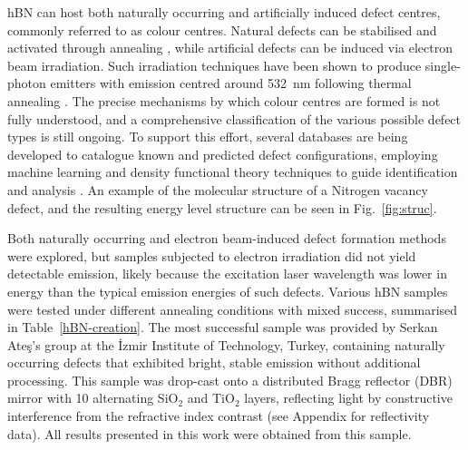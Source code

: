 hBN can host both naturally occurring and artificially induced defect centres, commonly referred to as colour centres. Natural defects can be stabilised and activated through annealing \cite{Mohajerani2024}, while artificial defects can be induced via electron beam irradiation. Such irradiation techniques have been shown to produce single-photon emitters with emission centred around 532~nm following thermal annealing \cite{NgocMyDuong2018, Bianco2023}. The precise mechanisms by which colour centres are formed is not fully understood, and a comprehensive classification of the various possible defect types is still ongoing. To support this effort, several databases are being developed to catalogue known and predicted defect configurations, employing machine learning and density functional theory techniques to guide identification and analysis \cite{Cholsuk2024, zotero-item-9536}. An example of the molecular structure of a Nitrogen vacancy defect, and the resulting energy level structure can be seen in Fig.~\ref{fig:struc}.

Both naturally occurring and electron beam-induced defect formation methods were explored, but samples subjected to electron irradiation did not yield detectable emission, likely because the excitation laser wavelength was lower in energy than the typical emission energies of such defects. Various hBN samples were tested under different annealing conditions with mixed success, summarised in Table~\ref{hBN-creation}. The most successful sample was provided by Serkan Ateş’s group at the İzmir Institute of Technology, Turkey, containing naturally occurring defects that exhibited bright, stable emission without additional processing. This sample was drop-cast onto a distributed Bragg reflector (DBR) mirror with 10 alternating SiO$_2$ and TiO$_2$ layers, reflecting light by constructive interference from the refractive index contrast (see Appendix for reflectivity data). All results presented in this work were obtained from this sample.



